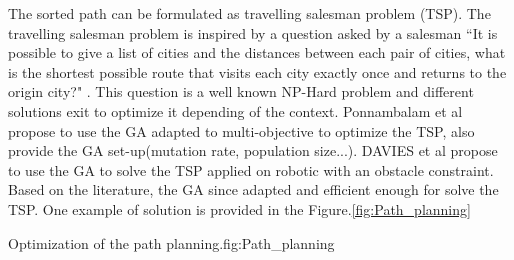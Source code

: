 The sorted path can be formulated as travelling salesman problem (TSP). The travelling salesman problem is inspired by a question asked by a salesman  ``It is possible to give a list of cities and the distances between each pair of cities, what is the shortest possible route that visits each city exactly once and returns to the origin city?" . This question is a well known NP-Hard problem and different solutions exit to optimize it depending of the context. Ponnambalam et al \cite{172*} propose to use the GA adapted to  multi-objective to optimize the TSP, also provide the GA set-up(mutation rate, population size...). DAVIES et al \cite{56*} propose to use the GA to solve the TSP applied on robotic with an obstacle constraint. \\
Based on the literature, the GA since adapted and efficient enough for solve the TSP.
One example of solution is provided in the Figure.\ref{fig:Path_planning}

\begin{mfigures}[!]{ Optimization of the path planning.}{fig:Path_planning} \centering
{}
\hspace{1cm}
\end{mfigures}	


 

